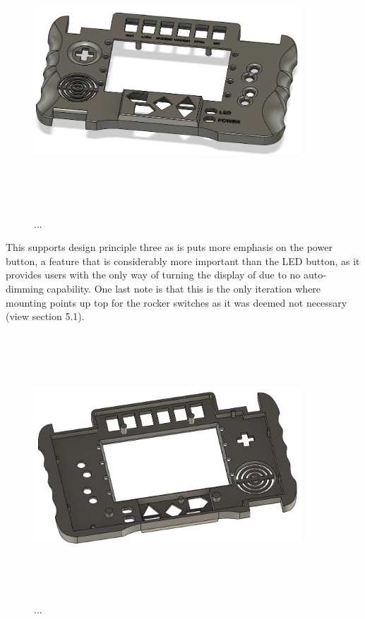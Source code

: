 \begin{figure} [h]
    \centering
    \includegraphics[width=10cm,height=10cm,keepaspectratio]{Figures/iteration3_top_front.png}
    \caption{...}
    \label{fig:iteration3_t_f}
\end{figure}

This supports design principle three as is puts more emphasis on the power button, a feature that is considerably more important than the LED button, as it provides users with the only way of turning the display of due to no auto-dimming capability.
One last note is that this is the only iteration where mounting points up top for the rocker switches as it was deemed not necessary (view section 5.1).

\begin{figure} [h]
    \centering
    \includegraphics[width=10cm,height=10cm,keepaspectratio]{Figures/iteration3_top_back.png}
    \caption{...}
    \label{fig:iteration3_t_b}
\end{figure}

